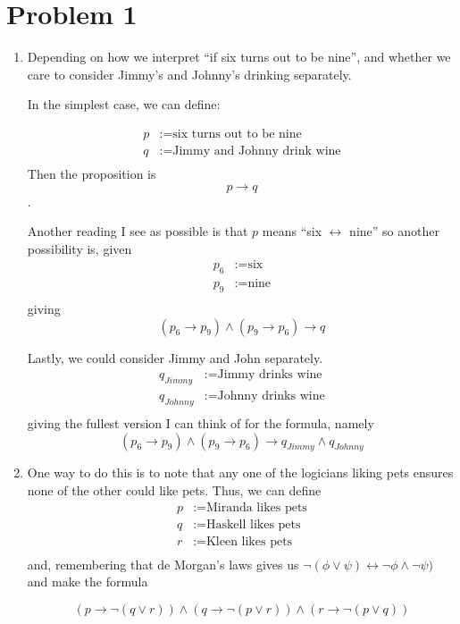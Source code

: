\documentclass{article}
\author{Rikard Hjort}
\begin{document}
\maketitle
\section*{Problem 1}
\begin{enumerate}[(1)]
    \item Depending on how we interpret ``if six turns out to be nine'', and whether we care to consider Jimmy's and Johnny's drinking separately.

        In the simplest case, we can define:

        \begin{align*}
            p &:= \text{six turns out to be nine} \\
            q &:= \text{Jimmy and Johnny drink wine} \\
        \end{align*}
        Then the proposition is $$p \rightarrow q$$.

        Another reading I see as possible is that $p$ means ``six $ \leftrightarrow$ nine'' so another possibility is, given
        \begin{align*}
            p_6 &:= \text{six} \\
            p_9 &:= \text{nine} \\
        \end{align*}
        giving 
        $$(p_6 \rightarrow p_9) \land (p_9 \rightarrow p_6) \rightarrow q$$

        Lastly, we could consider Jimmy and John separately.
        \begin{align*}
            q_{Jimmy} &:= \text{Jimmy drinks wine} \\
            q_{Johnny} &:= \text{Johnny drinks wine} \\
        \end{align*}
        giving the fullest version I can think of for the formula, namely
        $$(p_6 \rightarrow p_9) \land (p_9 \rightarrow p_6) \rightarrow q_{Jimmy} \land q_{Johnny}$$

    \item
        One way to do this is to note that any one of the logicians liking pets ensures none of the other could like pets. Thus, we can define
        \begin{align*}
            p &:= \text{Miranda likes pets} \\
            q &:= \text{Haskell likes pets} \\
            r &:= \text{Kleen likes pets} \\
        \end{align*}
        and, remembering that de Morgan's laws gives us $ \lnot(\phi \lor \psi) \leftrightarrow \lnot \phi \land \lnot \psi)$ and make the formula

        $$(p \rightarrow \lnot(q \lor r)) \land (q \rightarrow \lnot(p \lor r)) \land (r \rightarrow \lnot(p \lor q))$$

\end{enumerate}
\end{document}
